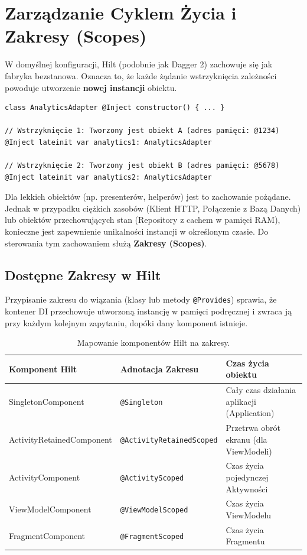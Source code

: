 \section{Zarządzanie Cyklem Życia i Zakresy (Scopes)}

W domyślnej konfiguracji, Hilt (podobnie jak Dagger 2) zachowuje się jak fabryka bezstanowa. Oznacza to, że każde żądanie wstrzyknięcia zależności powoduje utworzenie \textbf{nowej instancji} obiektu.

\begin{verbatim}
class AnalyticsAdapter @Inject constructor() { ... }

// Wstrzyknięcie 1: Tworzony jest obiekt A (adres pamięci: @1234)
@Inject lateinit var analytics1: AnalyticsAdapter

// Wstrzyknięcie 2: Tworzony jest obiekt B (adres pamięci: @5678)
@Inject lateinit var analytics2: AnalyticsAdapter
\end{verbatim}

Dla lekkich obiektów (np. presenterów, helperów) jest to zachowanie pożądane. Jednak w przypadku ciężkich zasobów (Klient HTTP, Połączenie z Bazą Danych) lub obiektów przechowujących stan (Repository z cachem w pamięci RAM), konieczne jest zapewnienie unikalności instancji w określonym czasie. Do sterowania tym zachowaniem służą \textbf{Zakresy (Scopes)}.

\subsection{Dostępne Zakresy w Hilt}

Przypisanie zakresu do wiązania (klasy lub metody \texttt{@Provides}) sprawia, że kontener DI przechowuje utworzoną instancję w pamięci podręcznej i zwraca ją przy każdym kolejnym zapytaniu, dopóki dany komponent istnieje.

\begin{table}[h]
\centering
\begin{tabularx}{\linewidth}{|l|l|X|}
\hline
\textbf{Komponent Hilt} & \textbf{Adnotacja Zakresu} & \textbf{Czas życia obiektu} \\ \hline
SingletonComponent      & \texttt{@Singleton}        & Cały czas działania aplikacji (Application) \\ \hline
ActivityRetainedComponent & \texttt{@ActivityRetainedScoped} & Przetrwa obrót ekranu (dla ViewModeli) \\ \hline
ActivityComponent       & \texttt{@ActivityScoped}   & Czas życia pojedynczej Aktywności \\ \hline
ViewModelComponent      & \texttt{@ViewModelScoped}  & Czas życia ViewModelu \\ \hline
FragmentComponent       & \texttt{@FragmentScoped}   & Czas życia Fragmentu \\ \hline
\end{tabularx}
\caption{Mapowanie komponentów Hilt na zakresy.}
\end{table}

